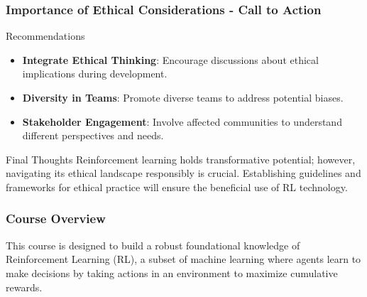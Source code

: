 \documentclass[aspectratio=169]{beamer}
\begin{document}
\begin{frame}[fragile]
    \frametitle{Importance of Ethical Considerations - Call to Action}
    \begin{block}{Recommendations}
        \begin{itemize}
            \item \textbf{Integrate Ethical Thinking}: Encourage discussions about ethical implications during development.
            \item \textbf{Diversity in Teams}: Promote diverse teams to address potential biases.
            \item \textbf{Stakeholder Engagement}: Involve affected communities to understand different perspectives and needs.
        \end{itemize}
    \end{block}

    \begin{block}{Final Thoughts}
        Reinforcement learning holds transformative potential; however, navigating its ethical landscape responsibly is crucial. Establishing guidelines and frameworks for ethical practice will ensure the beneficial use of RL technology.
    \end{block}
\end{frame}

\begin{frame}[fragile]
    \frametitle{Course Overview}
    This course is designed to build a robust foundational knowledge of Reinforcement Learning (RL), a subset of machine learning where agents learn to make decisions by taking actions in an environment to maximize cumulative rewards. 
\end{frame}
\end{document}
